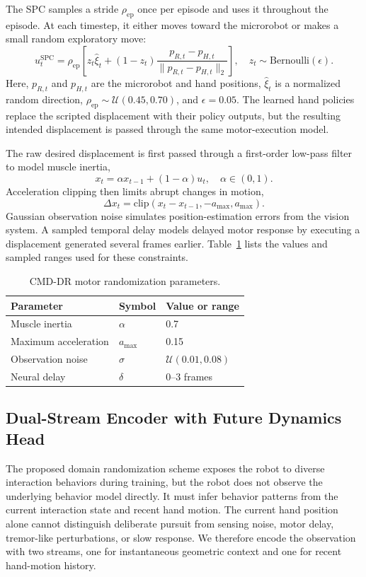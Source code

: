 \documentclass[lettersize,journal]{IEEEtran}
\begin{document}
The SPC samples a stride $\rho_{\mathrm{ep}}$ once per episode and uses it throughout the episode. At each timestep, it either moves toward the microrobot or makes a small random exploratory move:
\begin{equation}
 u_t^{\mathrm{SPC}}=\rho_{\mathrm{ep}}\left[z_t\hat{\xi}_t+(1-z_t)\frac{p_{R,t}-p_{H,t}}{\|p_{R,t}-p_{H,t}\|_2}\right],
 \quad z_t\sim\mathrm{Bernoulli}(\epsilon).
\end{equation}
Here, $p_{R,t}$ and $p_{H,t}$ are the microrobot and hand positions, $\hat{\xi}_t$ is a normalized random direction, $\rho_{\mathrm{ep}}\sim\mathcal{U}(0.45,0.70)$, and $\epsilon=0.05$. The learned hand policies replace the scripted displacement with their policy outputs, but the resulting intended displacement is passed through the same motor-execution model.

The raw desired displacement is first passed through a first-order low-pass filter to model muscle inertia,
\begin{equation}
 x_t=\alpha x_{t-1}+(1-\alpha)u_t, \quad \alpha\in(0,1).
\end{equation}
Acceleration clipping then limits abrupt changes in motion,
\begin{equation}
 \Delta x_t=\mathrm{clip}(x_t-x_{t-1},-a_{\max},a_{\max}).
\end{equation}
Gaussian observation noise simulates position-estimation errors from the vision system. A sampled temporal delay models delayed motor response by executing a displacement generated several frames earlier. Table~\ref{tab:cmd_dr} lists the values and sampled ranges used for these constraints.

\begin{table}[!t]
\caption{CMD-DR motor randomization parameters.}
\label{tab:cmd_dr}
\centering
\footnotesize
\setlength{\tabcolsep}{3.5pt}
\begin{tabular}{@{}lll@{}}
\toprule
Parameter & Symbol & Value or range \\
\midrule
Muscle inertia & $\alpha$ & 0.7 \\
Maximum acceleration & $a_{\max}$ & 0.15 \\
Observation noise & $\sigma$ & $\mathcal{U}(0.01,0.08)$ \\
Neural delay & $\delta$ & 0--3 frames \\
\bottomrule
\end{tabular}
\end{table}

\subsection{Dual-Stream Encoder with Future Dynamics Head}
The proposed domain randomization scheme exposes the robot to diverse interaction behaviors during training, but the robot does not observe the underlying behavior model directly. It must infer behavior patterns from the current interaction state and recent hand motion. The current hand position alone cannot distinguish deliberate pursuit from sensing noise, motor delay, tremor-like perturbations, or slow response. We therefore encode the observation with two streams, one for instantaneous geometric context and one for recent hand-motion history.
\end{document}
